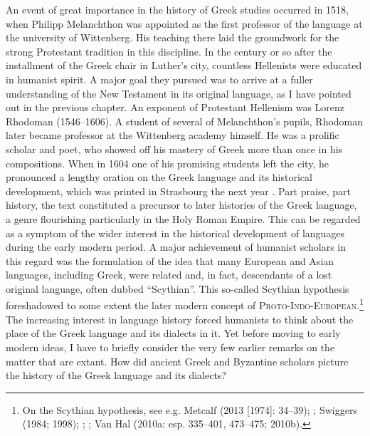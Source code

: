 \documentclass[output=paper]{langsci/langscibook}
\begin{document}
An event of great importance in the history of Greek studies occurred in 1518, when Philipp Melanchthon was appointed as the first professor of the language at the university of Wittenberg. His teaching there laid the groundwork for the strong Protestant tradition in this discipline. In the century or so after the installment of the Greek chair in Luther’s city, countless Hellenists were educated in humanist spirit. A major goal they pursued was to arrive at a fuller understanding of the New Testament in its original language, as I have pointed out in the previous chapter. An exponent of Protestant Hellenism was Lorenz Rhodoman (1546–1606). A student of several of Melanchthon’s pupils, Rhodoman later became professor at the Wittenberg academy himself. He was a prolific scholar and poet, who showed off his mastery of Greek more than once in his compositions. When in 1604 one of his promising students left the city, he pronounced a lengthy oration on the Greek language and its historical development, which was printed in Strasbourg the next year \citep{Rhodoman1605}. Part praise, part history, the text constituted a precursor to later histories of the Greek language, a genre flourishing particularly in the Holy Roman Empire. This can be regarded as a symptom of the wider interest in the historical development of languages during the early modern period. A major achievement of humanist scholars in this regard was the formulation of the idea that many European and Asian languages, including Greek, were related and, in fact, descendants of a lost original language, often dubbed “Scythian”. This so-called Scythian hypothesis foreshadowed to some extent the later modern concept of \textsc{Proto-Indo-European}.\footnote{On the Scythian hypothesis, see e.g. Metcalf (2013 [1974]: 34–39); \citet{Droixhe1980}; Swiggers (1984; 1998); \citet{Villani2003}; \citet{Considine2010}; Van Hal (2010a: esp. 335–401, 473–475; 2010b).} The increasing interest in language history forced humanists to think about the place of the Greek language and its dialects in it. Yet before moving to early modern ideas, I have to briefly consider the very few earlier remarks on the matter that are extant. How did ancient Greek and Byzantine scholars picture the history of the Greek language and its dialects?
\end{document}
